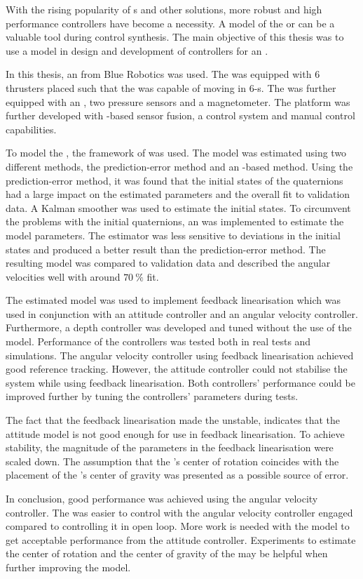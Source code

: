 With the rising popularity of \abbrROV{}s and other \abbrUV solutions, more robust and high performance controllers have become a necessity. A model of the \abbrROV or \abbrUV can be a valuable tool during control synthesis. The main objective of this thesis was to use a model in design and development of controllers for an \abbrROV.

In this thesis, an \abbrROV from Blue Robotics was used. The \abbrROV was equipped with 6 thrusters placed such that the \abbrROV was capable of moving in 6-\abbrDOF{}s. The \abbrROV was further equipped with an \abbrIMU, two pressure sensors and a magnetometer. The \abbrROV platform was further developed with \abbrEKF{}-based sensor fusion, a control system and manual control capabilities.
 
To model the \abbrROV, the framework of \citet{fossen2011} was used. The model was estimated using two different methods, the prediction-error method and an \abbrEKF-based method. Using the prediction-error method, it was found that the initial states of the quaternions had a large impact on the estimated parameters and the overall fit to validation data. A Kalman smoother was used to estimate the initial states. To circumvent the problems with the initial quaternions, an \abbrEKF was implemented to estimate the model parameters. The \abbrEKF estimator was less sensitive to deviations in the initial states and produced a better result than the prediction-error method. The resulting model was compared to validation data and described the angular velocities well with around $70\ \%$ fit.

The estimated model was used to implement feedback linearisation which was used in conjunction with an attitude controller and an angular velocity controller. Furthermore, a depth controller was developed and tuned without the use of the model.  
Performance of the controllers was tested both in real tests and simulations. The angular velocity controller using feedback linearisation achieved good reference tracking. However, the attitude controller could not stabilise the system while using feedback linearisation. Both controllers' performance could be improved further by tuning the controllers' parameters during tests. 

The fact that the feedback linearisation made the \abbrROV unstable, indicates that the attitude model is not good enough for use in feedback linearisation. To achieve stability, the magnitude of the parameters in the feedback linearisation were scaled down. The assumption that the \abbrROV{}'s center of rotation coincides with the placement of the \abbrROV{}'s center of gravity was presented as a possible source of error. 

In conclusion, good performance was achieved using the angular velocity controller. The \abbrROV was easier to control with the angular velocity controller engaged compared to controlling it in open loop. More work is needed with the model to get acceptable performance from the attitude controller. Experiments to estimate the center of rotation and the center of gravity of the \abbrROV may be helpful when further improving the model.
